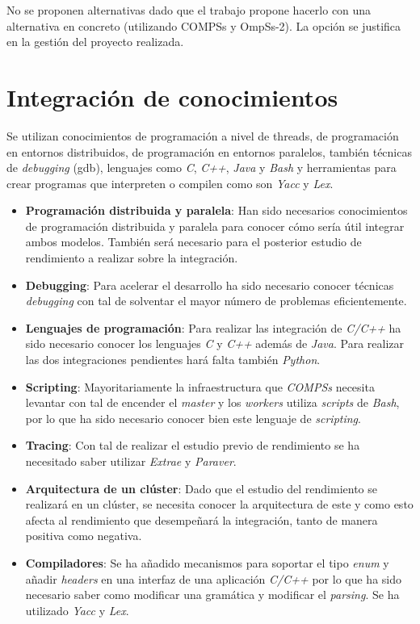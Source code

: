 No se proponen alternativas dado que el trabajo propone hacerlo con una alternativa en concreto (utilizando COMPSs y OmpSs-2). La opción se justifica en la gestión del proyecto realizada.

\section{Integración de conocimientos}

Se utilizan conocimientos de programación a nivel de threads, de programación en entornos distribuidos, de programación en entornos paralelos, también técnicas de \textit{debugging} (gdb), lenguajes como \textit{C}, \textit{C++}, \textit{Java} y \textit{Bash} y herramientas para crear programas que interpreten o compilen como son \textit{Yacc} y \textit{Lex}.

\begin{itemize}
 \item \textbf{Programación distribuida y paralela}: Han sido necesarios conocimientos de programación distribuida y paralela para conocer cómo sería útil integrar ambos modelos. También será necesario para el posterior estudio de rendimiento a realizar sobre la integración.
 \item \textbf{Debugging}: Para acelerar el desarrollo ha sido necesario conocer técnicas \textit{debugging} con tal de solventar el mayor número de problemas eficientemente.
 \item \textbf{Lenguajes de programación}: Para realizar las integración de \textit{C/C++} ha sido necesario conocer los lenguajes \textit{C} y \textit{C++} además de \textit{Java}. Para realizar las dos integraciones pendientes hará falta también \textit{Python}.
 \item \textbf{Scripting}: Mayoritariamente la infraestructura que \textit{COMPSs} necesita levantar con tal de encender el \textit{master} y los \textit{workers} utiliza \textit{scripts} de \textit{Bash}, por lo que ha sido necesario conocer bien este lenguaje de \textit{scripting}.
 \item \textbf{Tracing}: Con tal de realizar el estudio previo de rendimiento se ha necesitado saber utilizar \textit{Extrae} y \textit{Paraver}.
 \item \textbf{Arquitectura de un clúster}: Dado que el estudio del rendimiento se realizará en un clúster, se necesita conocer la arquitectura de este y como esto afecta al rendimiento que desempeñará la integración, tanto de manera positiva como negativa.
 \item \textbf{Compiladores}: Se ha añadido mecanismos para soportar el tipo \textit{enum} y añadir \textit{headers} en una interfaz de una aplicación \textit{C/C++} por lo que ha sido necesario saber como modificar una gramática y modificar el \textit{parsing}. Se ha utilizado \textit{Yacc} y \textit{Lex}.
\end{itemize}


